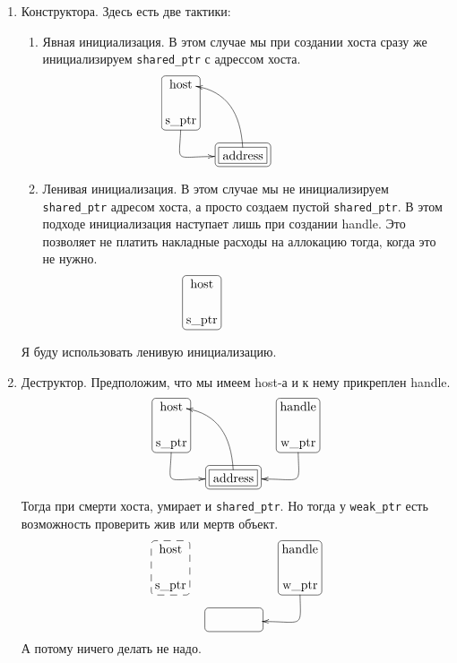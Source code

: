 \begin{enumerate}
\item Конструктора.
Здесь есть две тактики:
\begin{enumerate}
\item Явная инициализация.
В этом случае мы при создании хоста сразу же инициализируем \verb"shared_ptr" с адрессом хоста.
\[
\xymatrix@R=15pt@C=15pt{
  {\text{host}}
  	{
	\save
   [].[d]*[F-:<3pt>]\frm{}
   \restore
	}
  &{}&{\phantom{handle}}
  \\ 
  {\text{s\_ptr}}\ar@(d,l)[dr]+(-8,0)
  &{}&{\phantom{s\_ptr}}\\
  {}&{\text{address}}\ar@(u,r)[uul]
      	{
	\save
   [].[]*[F-]\frm{}
   \restore
	}
    	{
	\save
   [].[]*+[F-:<3pt>]\frm{}
   \restore
	}
  &{}\\
}
\]
\item Ленивая инициализация.
В этом случае мы не инициализируем \verb"shared_ptr" адресом хоста, а просто создаем пустой \verb"shared_ptr".
В этом подходе инициализация наступает лишь при создании handle.
Это позволяет не платить накладные расходы на аллокацию тогда, когда это не нужно.
\[
\xymatrix@R=15pt@C=15pt{
  {\text{host}}
  	{
	\save
   [].[d]*[F-:<3pt>]\frm{}
   \restore
	}
  &{}&{\phantom{handle}}
  \\ 
  {\text{s\_ptr}}%
  &{}&{\phantom{s\_ptr}}\\
}
\]
\end{enumerate}
Я буду использовать ленивую инициализацию.

\item Деструктор.
Предположим, что мы имеем host-а и к нему прикреплен  handle.
\[
\xymatrix@R=15pt@C=15pt{
  {\text{host}}
  	{
	\save
   [].[d]*[F-:<3pt>]\frm{}
   \restore
	}
  &{}&{\text{handle}}
    	{
	\save
   [].[d]*[F-:<3pt>]\frm{}
   \restore
	}
  \\ 
  {\text{s\_ptr}}\ar@(d,l)[dr]+(-8,0)&{}&{\text{w\_ptr}}\ar@(d,r)[dl]+(8,0)\\
  {}&{\text{address}}\ar@(u,r)[uul]
      	{
	\save
   [].[]*[F-]\frm{}
   \restore
	}
    	{
	\save
   [].[]*+[F-:<3pt>]\frm{}
   \restore
	}
  &{}\\
}
\]
Тогда при смерти хоста, умирает и \verb"shared_ptr".
Но тогда у \verb"weak_ptr" есть возможность проверить жив или мертв объект.
\[
\xymatrix@R=15pt@C=15pt{
  {\text{host}}
  	{
	\save
   [].[d]*[F--:<3pt>]\frm{}
   \restore
	}
  &{}&{\text{handle}}
    	{
	\save
   [].[d]*[F-:<3pt>]\frm{}
   \restore
	}
  \\ 
  {\text{s\_ptr}}&{}&{\text{w\_ptr}}\ar@(d,r)[dl]+(8,0)\\
  {}&{\phantom{address}}
      	{
	\save
   [].[]*\frm{}
   \restore
	}
    	{
	\save
   [].[]*+[F-:<3pt>]\frm{}
   \restore
	}
  &{}\\
}
\]
А потому ничего делать не надо.


\end{enumerate}
